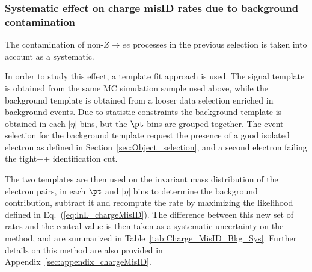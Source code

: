  \subsubsection{Systematic effect on charge misID rates due to background contamination}

The contamination of non-$Z\rightarrow{}ee$ processes in the previous selection is taken into account as a systematic.

In order to study this effect, a template fit approach is used. The signal template is obtained from the same MC simulation sample used above, while the background template is obtained from a looser data selection enriched in background events. Due to statistic constraints the background template is obtained in each $|\eta|$ bins, but the $\pt$ bins are grouped together. The event selection for the background template request the presence of a good isolated electron as defined in Section~\ref{sec:Object_selection}, and a second electron failing the tight++ identification cut. 

The two templates are then used on the invariant mass distribution of the electron pairs, in each $\pt$ and $|\eta|$ bins to determine the background contribution, subtract it and recompute the rate by maximizing the likelihood defined in Eq.~(\ref{eq:lnL_chargeMisID}). The difference between this new set of rates and the central value is then taken as a systematic uncertainty on the method, and are summarized in Table~\ref{tab:Charge_MisID_Bkg_Sys}. Further details on this method are also provided in Appendix~\ref{sec:appendix_chargeMisID}.







